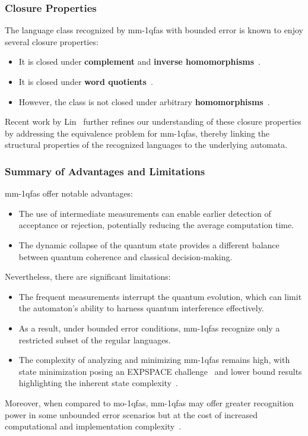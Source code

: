 \subsubsection{Closure Properties}
The language class recognized by \gls{mm-1qfa}s with bounded error is known to enjoy several closure properties:
\begin{itemize}
    \item It is closed under \textbf{complement} and \textbf{inverse homomorphisms}~\cite{brodsky2002characterizations}.
    \item It is closed under \textbf{word quotients}~\cite{brodsky2002characterizations}.
    \item However, the class is not closed under arbitrary \textbf{homomorphisms}~\cite{646094,10.1007/3-540-45007-6_1}.
\end{itemize}
Recent work by Lin~\cite{LIN2012807} further refines our understanding of these closure properties by addressing the equivalence problem for \gls{mm-1qfa}s, thereby linking the structural properties of the recognized languages to the underlying automata.

\subsubsection{Summary of Advantages and Limitations}
\gls{mm-1qfa}s offer notable advantages:
\begin{itemize}
    \item The use of intermediate measurements can enable earlier detection of acceptance or rejection, potentially reducing the average computation time.
    \item The dynamic collapse of the quantum state provides a different balance between quantum coherence and classical decision-making.
\end{itemize}
Nevertheless, there are significant limitations:
\begin{itemize}
    \item The frequent measurements interrupt the quantum evolution, which can limit the automaton’s ability to harness quantum interference effectively.
    \item As a result, under bounded error conditions, \gls{mm-1qfa}s recognize only a restricted subset of the regular languages.
    \item The complexity of analyzing and minimizing \gls{mm-1qfa}s remains high, with state minimization posing an EXPSPACE challenge~\cite{MATEUS201236} and lower bound results highlighting the inherent state complexity~\cite{10.1007/3-540-44612-5_9}.
\end{itemize}
Moreover, when compared to \gls{mo-1qfa}s, \gls{mm-1qfa}s may offer greater recognition power in some unbounded error scenarios but at the cost of increased computational and implementation complexity~\cite{646094,10.1007/3-540-44669-9_10}.

